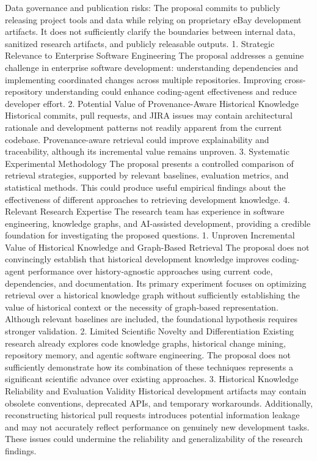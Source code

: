 Data governance and publication risks: The proposal commits to publicly releasing project tools and data while relying on proprietary eBay development artifacts. It does not sufficiently clarify the boundaries between internal data, sanitized research artifacts, and publicly releasable outputs.
1. Strategic Relevance to Enterprise Software Engineering
The proposal addresses a genuine challenge in enterprise software development: understanding dependencies and implementing coordinated changes across multiple repositories. Improving cross-repository understanding could enhance coding-agent effectiveness and reduce developer effort.
2. Potential Value of Provenance-Aware Historical Knowledge
Historical commits, pull requests, and JIRA issues may contain architectural rationale and development patterns not readily apparent from the current codebase. Provenance-aware retrieval could improve explainability and traceability, although its incremental value remains unproven.
3. Systematic Experimental Methodology
The proposal presents a controlled comparison of retrieval strategies, supported by relevant baselines, evaluation metrics, and statistical methods. This could produce useful empirical findings about the effectiveness of different approaches to retrieving development knowledge.
4. Relevant Research Expertise
The research team has experience in software engineering, knowledge graphs, and AI-assisted development, providing a credible foundation for investigating the proposed questions.
1. Unproven Incremental Value of Historical Knowledge and Graph-Based Retrieval
The proposal does not convincingly establish that historical development knowledge improves coding-agent performance over history-agnostic approaches using current code, dependencies, and documentation. Its primary experiment focuses on optimizing retrieval over a historical knowledge graph without sufficiently establishing the value of historical context or the necessity of graph-based representation. Although relevant baselines are included, the foundational hypothesis requires stronger validation.
2. Limited Scientific Novelty and Differentiation
Existing research already explores code knowledge graphs, historical change mining, repository memory, and agentic software engineering. The proposal does not sufficiently demonstrate how its combination of these techniques represents a significant scientific advance over existing approaches.
3. Historical Knowledge Reliability and Evaluation Validity
Historical development artifacts may contain obsolete conventions, deprecated APIs, and temporary workarounds. Additionally, reconstructing historical pull requests introduces potential information leakage and may not accurately reflect performance on genuinely new development tasks. These issues could undermine the reliability and generalizability of the research findings.

